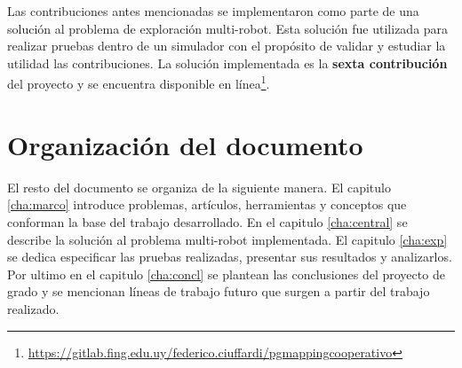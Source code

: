 


Las contribuciones antes mencionadas se implementaron como parte de una
solución al problema de exploración multi-robot. Esta solución fue utilizada para
realizar pruebas dentro de un simulador con el propósito de validar y estudiar
la utilidad las contribuciones. La solución implementada es la \textbf{sexta
contribución} del proyecto y se encuentra disponible en
línea\footnote{\url{https://gitlab.fing.edu.uy/federico.ciuffardi/pgmappingcooperativo}}.

\section{Organización del documento}
El resto del documento se organiza de la siguiente manera. El capitulo
\ref{cha:marco} introduce problemas, artículos, herramientas y conceptos que
conforman la base del trabajo desarrollado. En el capitulo \ref{cha:central} se
describe la solución al problema multi-robot implementada. El capitulo
\ref{cha:exp} se dedica especificar las pruebas realizadas, presentar sus
resultados y analizarlos. Por ultimo en el capitulo \ref{cha:concl} se plantean
las conclusiones del proyecto de grado y se mencionan líneas de trabajo futuro
que surgen a partir del trabajo realizado.


